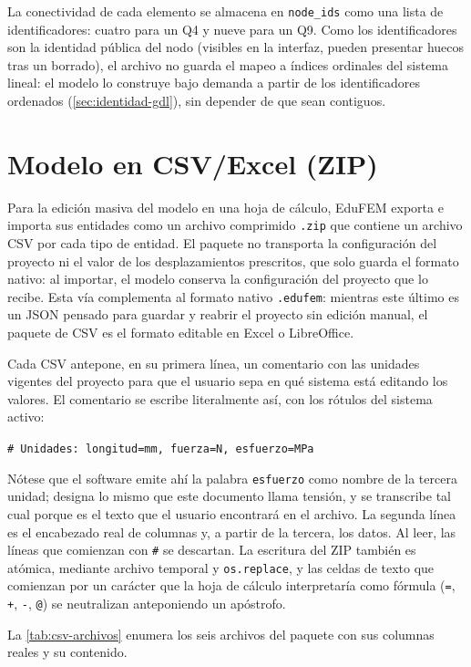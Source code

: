 La conectividad de cada elemento se almacena en \texttt{node\_ids} como una lista de identificadores: cuatro para un Q4 y nueve para un Q9. Como los identificadores son la identidad pública del nodo (visibles en la interfaz, pueden presentar huecos tras un borrado), el archivo no guarda el mapeo a índices ordinales del sistema lineal: el modelo lo construye bajo demanda a partir de los identificadores ordenados (\autoref{sec:identidad-gdl}), sin depender de que sean contiguos.

\section{Modelo en CSV/Excel (ZIP)}

Para la edición masiva del modelo en una hoja de cálculo, EduFEM exporta e importa sus entidades como un archivo comprimido \texttt{.zip} que contiene un archivo CSV por cada tipo de entidad. El paquete no transporta la configuración del proyecto ni el valor de los desplazamientos prescritos, que solo guarda el formato nativo: al importar, el modelo conserva la configuración del proyecto que lo recibe. Esta vía complementa al formato nativo \texttt{.edufem}: mientras este último es un JSON pensado para guardar y reabrir el proyecto sin edición manual, el paquete de CSV es el formato editable en Excel o LibreOffice.

Cada CSV antepone, en su primera línea, un comentario con las unidades vigentes del proyecto para que el usuario sepa en qué sistema está editando los valores. El comentario se escribe literalmente así, con los rótulos del sistema activo:
\begin{center}\texttt{\# Unidades: longitud=mm, fuerza=N, esfuerzo=MPa}\end{center}
\noindent Nótese que el software emite ahí la palabra \texttt{esfuerzo} como nombre de la tercera unidad; designa lo mismo que este documento llama tensión, y se transcribe tal cual porque es el texto que el usuario encontrará en el archivo. La segunda línea es el encabezado real de columnas y, a partir de la tercera, los datos. Al leer, las líneas que comienzan con \texttt{\#} se descartan. La escritura del ZIP también es atómica, mediante archivo temporal y \texttt{os.replace}, y las celdas de texto que comienzan por un carácter que la hoja de cálculo interpretaría como fórmula (\texttt{=}, \texttt{+}, \texttt{-}, \texttt{@}) se neutralizan anteponiendo un apóstrofo.

La \autoref{tab:csv-archivos} enumera los seis archivos del paquete con sus columnas reales y su contenido.

